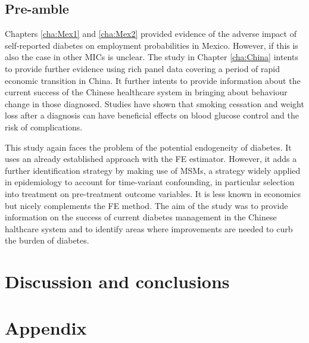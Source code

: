 \section*{Pre-amble}

Chapters \ref{cha:Mex1} and \ref{cha:Mex2} provided evidence of the adverse impact of self-reported diabetes on employment probabilities in Mexico. However, if this is also the case in other \acp{MIC} is unclear. The study in Chapter \ref{cha:China} intents to provide further evidence using rich panel data covering a period of rapid economic transition in China. It further intents to provide information about the current success of the Chinese healthcare system in bringing about behaviour change in those diagnosed. Studies have shown that smoking cessation and weight loss after a diagnosis can have beneficial effects on blood glucose control and the risk of complications.

This study again faces the problem of the potential endogeneity of diabetes. It uses an already established approach with the \ac{FE} estimator. However, it adds a further identification strategy by making use of \acp{MSM}, a strategy widely applied in epidemiology to account for time-variant confounding, in particular selection into treatment on pre-treatment outcome variables. It is less known in economics but nicely complements the \ac{FE} method. The aim of the study was to provide information on the success of current diabetes management in the Chinese halthcare system and to identify areas where improvements are needed to curb the burden of diabetes.

\chapter{\label{cha:Discussion}Discussion and conclusions} 

\chapter*{\label{cha:Appendix}Appendix}

\printbibliography


          
